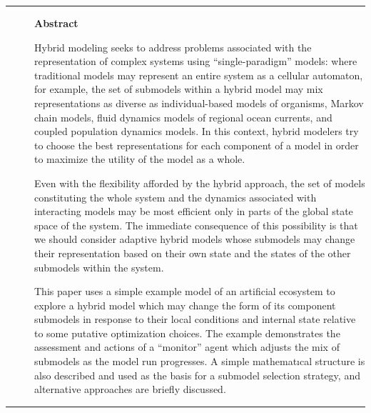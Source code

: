 \rule{\textwidth}{2pt}

\begin{description}
  \item[ ]
    \textbf{Abstract}

     Hybrid modeling seeks to address problems associated with the
     rep\-re\-sen\-ta\-tion of complex systems using ``single-paradigm'' models:
     where traditional models may represent an entire system as a
     cellular automaton, for example, the set of submodels within a hybrid
     model may mix rep\-re\-sen\-ta\-tions as diverse as in\-di\-vidu\-al-based models
     of organisms, Markov chain models, fluid dynamics models of regional
     ocean currents, and coupled population dynamics models. In this
     context, hybrid modelers try to choose the best rep\-re\-sen\-ta\-tions for
     each component of a model in order to maximize the utility of the
     model as a whole.

     Even with the flexibility afforded by the hybrid approach, the set
     of models constituting the whole system and the dynamics associated
     with interacting models may be most efficient only in parts of the
     global state space of the system.  The immediate consequence of this
     possibility is that we should consider adaptive hybrid models whose
     submodels may change their rep\-re\-sen\-ta\-tion based on their own
     state and the states of the other sub\-models within the system.

     This paper uses a simple example model of an artificial ecosystem to
     explore a hybrid model which may change the form of its component
     sub\-models in response to their local conditions and internal state
     relative to some putative optimization choices.  The example
     demonstrates the assessment and actions of a ``monitor'' agent which
     adjusts the mix of sub\-models as the model run progresses.  A simple
     math\-e\-mat\-\i\-cal structure is also described and used as the basis for a
     sub\-model selection strategy, and alternative approaches are briefly
     discussed.
\end{description}

\rule{\textwidth}{2pt}




